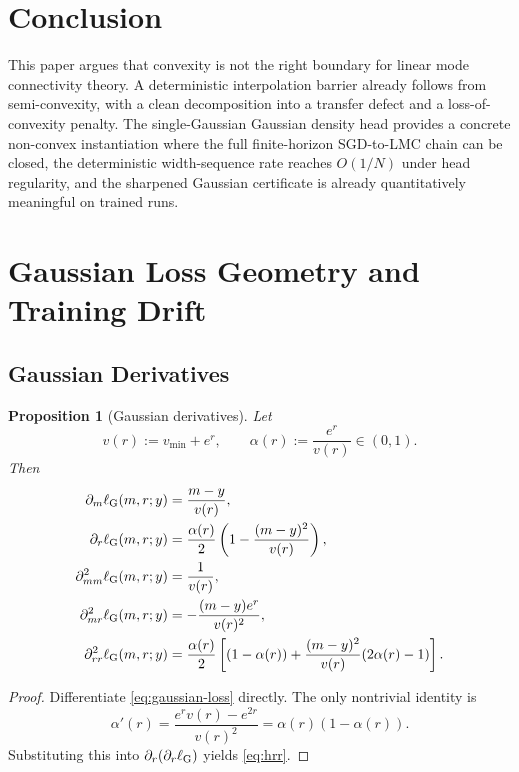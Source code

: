 \documentclass[11pt]{article}
\newtheorem{proposition}[theorem]{Proposition}
\theoremstyle{definition}
\begin{document}
\section{Conclusion}
\label{sec:conclusion}

This paper argues that convexity is not the right boundary for linear mode
connectivity theory. A deterministic interpolation barrier already follows from
semi-convexity, with a clean decomposition into a transfer defect and a
loss-of-convexity penalty. The single-Gaussian Gaussian density head provides a
concrete non-convex instantiation where the full finite-horizon SGD-to-LMC
chain can be closed, the deterministic width-sequence rate reaches $O(1/N)$
under head regularity, and the sharpened Gaussian certificate is already
quantitatively meaningful on trained runs.

\appendix

\section{Gaussian Loss Geometry and Training Drift}

\subsection{Gaussian Derivatives}

\begin{proposition}[Gaussian derivatives]
\label{prop:gaussian-derivatives}
Let
\[
  v(r):=v_{\min}+e^r,
  \qquad
  \alpha(r):=\frac{e^r}{v(r)}\in(0,1).
\]
Then
\begin{align}
  \partial_m \ell_{\rm G}(m,r;y)
  &=
  \frac{m-y}{v(r)},
  \label{eq:qm}
  \\
  \partial_r \ell_{\rm G}(m,r;y)
  &=
  \frac{\alpha(r)}{2}
  \left(
    1-\frac{(m-y)^2}{v(r)}
  \right),
  \label{eq:qr}
  \\
  \partial_{mm}^2 \ell_{\rm G}(m,r;y)
  &=
  \frac1{v(r)},
  \label{eq:hmm}
  \\
  \partial_{mr}^2 \ell_{\rm G}(m,r;y)
  &=
  -\frac{(m-y)e^r}{v(r)^2},
  \label{eq:hmr}
  \\
  \partial_{rr}^2 \ell_{\rm G}(m,r;y)
  &=
  \frac{\alpha(r)}{2}
  \left[
    (1-\alpha(r))
    +
    \frac{(m-y)^2}{v(r)}(2\alpha(r)-1)
  \right].
  \label{eq:hrr}
\end{align}
\end{proposition}

\begin{proof}
Differentiate \eqref{eq:gaussian-loss} directly. The only nontrivial identity is
\[
  \alpha'(r)=\frac{e^r v(r)-e^{2r}}{v(r)^2}=\alpha(r)(1-\alpha(r)).
\]
Substituting this into $\partial_r(\partial_r\ell_{\rm G})$ yields
\eqref{eq:hrr}.
\end{proof}
\end{document}
